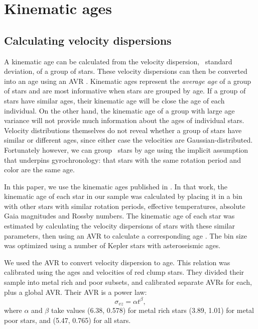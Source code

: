 \section{Kinematic ages}
\subsection{Calculating velocity dispersions}
\label{sec:velocity_dispersion}

A kinematic age can be calculated from the velocity dispersion, \ie\ standard
deviation, of a group of stars.
These velocity dispersions can then be converted into an age using an AVR
\citep[\eg][]{holmberg2009, yu2018}.
Kinematic ages represent the {\it average age} of a group of stars and are
most informative when stars are grouped by age.
If a group of stars have similar ages, their kinematic age will be close
the age of each individual.
On the other hand, the kinematic age of a group with large age variance will
not provide much information about the ages of individual stars.
Velocity distributions themselves do not reveal whether a group of stars have
similar or different ages, since either case the velocities are
Gaussian-distributed.
Fortunately however, we can group \kepler\ stars by age using the implicit
assumption that underpins gyrochronology: that stars with the same rotation
period and color are the same age.

In this paper, we use the kinematic ages published in \citet{lu2021}.
In that work, the kinematic age of each star in our sample was calculated by
placing it in a bin with other stars with similar rotation periods, effective
temperatures, absolute Gaia magnitudes and Rossby numbers.
The kinematic age of each star was estimated by calculating the velocity
dispersions of stars with these similar parameters, then using an AVR to
calculate a corresponding age \citep{yu2019}.
The bin size was optimized using a number of Kepler stars with asteroseismic
ages.

We used the \citet{yu2018} AVR to convert velocity dispersion to age.
This relation was calibrated using the ages and velocities of red clump stars.
They divided their sample into metal rich and poor subsets, and calibrated
separate AVRs for each, plus a global AVR.
Their AVR is a power law:
\begin{equation}
    \sigma_{vz} = \alpha t ^\beta,
\end{equation}
where $\alpha$ and $\beta$ take values (6.38, 0.578) for metal rich stars
(3.89, 1.01) for metal poor stars, and (5.47, 0.765) for all stars.

